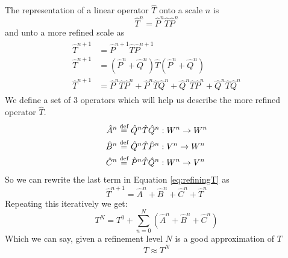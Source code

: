 \documentclass[../master_thesis.tex]{subfiles}
\begin{document}
The representation of a linear operator $\hat{T}$ onto a scale $n$ is
\begin{equation}
  \hat{T}^n = \hat{P}^n\hat{T}\hat{P}^n
\end{equation}
and unto a more refined scale as
\begin{align}\label{eq:refiningT}
  \begin{split}
    \hat{T}^{n+1} &= \hat{P}^{n+1}\hat{T}\hat{P}^{n+1}\\
    \hat{T}^{n+1} &= (\hat{P}^n + \hat{Q}^n)\hat{T}(\hat{P}^n + \hat{Q}^n)\\
    \hat{T}^{n+1} &= \hat{P}^n\hat{T}\hat{P}^n + \hat{P}^n\hat{T}\hat{Q}^n + \hat{Q}^n\hat{T}\hat{P}^n + \hat{Q}^n\hat{T}\hat{Q}^n
  \end{split}
\end{align}
We define a set of 3 operators which will help us describe the more refined operator
$\hat{T}$.
\begin{align}
  \hat{A}^n & \stackrel{\text{def}}{=}\hat{Q}^n\hat{T}\hat{Q}^n: W^n \to W^n\\
  \hat{B}^n & \stackrel{\text{def}}{=}\hat{Q}^n\hat{T}\hat{P}^n: V^n \to W^n\\
  \hat{C}^n & \stackrel{\text{def}}{=}\hat{P}^n\hat{T}\hat{Q}^n: W^n \to V^n
\end{align}
So we can rewrite the last term in Equation \ref{eq:refiningT} as
\begin{equation}\label{eq:refineT}
  \hat{T}^{n+1} =\hat{A}^n + \hat{B}^n + \hat{C}^n + \hat{T}^n
\end{equation}
Repeating this iteratively we get:
\begin{equation}
  T^N = T^0 + \sum^N_{n=0}\left( \hat{A}^n + \hat{B}^n + \hat{C}^n\right)
\end{equation}
Which we can say, given a refinement level $N$ is a good approximation of $T$
\begin{equation}
  T \approx T^N
\end{equation}
\end{document}
